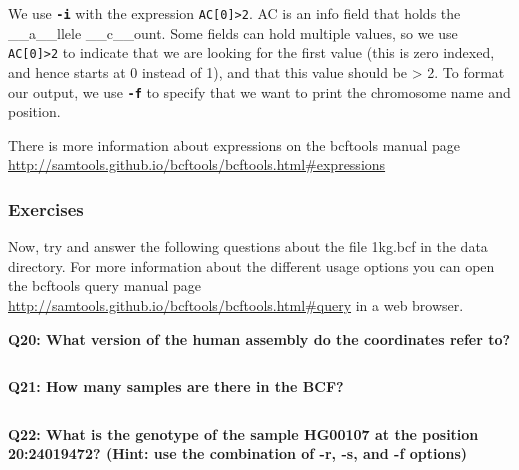 \documentclass[11pt]{article}
\makeatletter
\newcommand{\boxspacing}{\kern\kvtcb@left@rule\kern\kvtcb@boxsep}
\newcommand{\prompt}[4]{
        {\ttfamily\llap{{\color{blue}\LARGE\faKeyboardO\hspace{3pt}#4}}\vspace{-\baselineskip}}
    }
\makeatother
\begin{document}
    We use \textbf{\texttt{-i}} with the expression
\texttt{AC{[}0{]}\textgreater{}2}. AC is an info field that holds the
\_\_a\_\_llele \_\_c\_\_ount. Some fields can hold multiple values, so
we use \texttt{AC{[}0{]}\textgreater{}2} to indicate that we are looking
for the first value (this is zero indexed, and hence starts at 0 instead
of 1), and that this value should be \textgreater{} 2. To format our
output, we use \textbf{\texttt{-f}} to specify that we want to print the
chromosome name and position.

There is more information about expressions on the bcftools manual page
\url{http://samtools.github.io/bcftools/bcftools.html\#expressions}

    \hypertarget{exercises}{%
\subsubsection{Exercises}\label{exercises}}

Now, try and answer the following questions about the file 1kg.bcf in
the data directory. For more information about the different usage
options you can open the bcftools query manual page
\url{http://samtools.github.io/bcftools/bcftools.html\#query} in a web
browser.

    \textbf{Q20: What version of the human assembly do the coordinates refer
to?}

    \begin{tcolorbox}[breakable, size=fbox, boxrule=1pt, pad at break*=1mm,colback=cellbackground, colframe=cellborder]
\prompt{In}{incolor}{ }{\boxspacing}
\begin{Verbatim}[commandchars=\\\{\}]

\end{Verbatim}
\end{tcolorbox}

    \textbf{Q21: How many samples are there in the BCF?}

    \begin{tcolorbox}[breakable, size=fbox, boxrule=1pt, pad at break*=1mm,colback=cellbackground, colframe=cellborder]
\prompt{In}{incolor}{ }{\boxspacing}
\begin{Verbatim}[commandchars=\\\{\}]

\end{Verbatim}
\end{tcolorbox}

    \textbf{Q22: What is the genotype of the sample HG00107 at the position
20:24019472? (Hint: use the combination of -r, -s, and -f options)}
\end{document}
